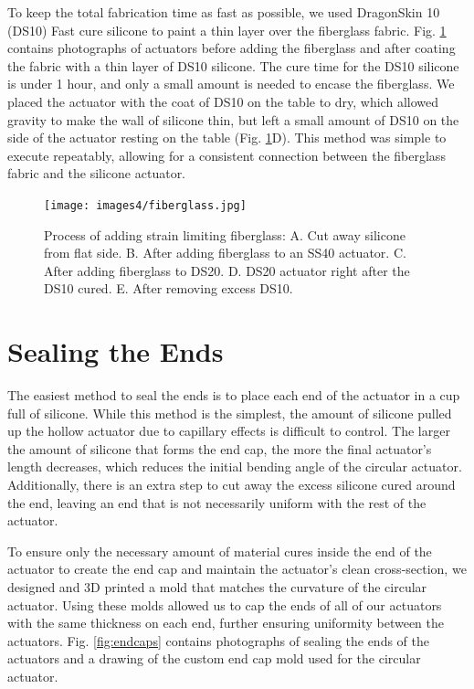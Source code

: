 To keep the total fabrication time as fast as possible, we used DragonSkin 10 (DS10) Fast cure silicone to paint a thin layer over the fiberglass fabric. Fig. \ref{fig:fiberglass} contains photographs of actuators before adding the fiberglass and after coating the fabric with a thin layer of DS10 silicone. The cure time for the DS10 silicone is under 1 hour, and only a small amount is needed to encase the fiberglass. We placed the actuator with the coat of DS10 on the table to dry, which allowed gravity to make the wall of silicone thin, but left a small amount of DS10 on the side of the actuator resting on the table (Fig. \ref{fig:fiberglass}D). This method was simple to execute repeatably, allowing for a consistent connection between the fiberglass fabric and the silicone actuator. 

\begin{figure}[ht!]
    \centering
    \texttt{[image: images4/fiberglass.jpg]}
    \caption{Process of adding strain limiting fiberglass: A. Cut away silicone from flat side. B. After adding fiberglass to an SS40 actuator. C. After adding fiberglass to DS20. D. DS20 actuator right after the DS10 cured. E. After removing excess DS10.}
    \label{fig:fiberglass}
\end{figure}

\clearpage
\section{Sealing the Ends}

The easiest method to seal the ends is to place each end of the actuator in a cup full of silicone. While this method is the simplest, the amount of silicone pulled up the hollow actuator due to capillary effects is difficult to control. The larger the amount of silicone that forms the end cap, the more the final actuator's length decreases, which reduces the initial bending angle of the circular actuator. Additionally, there is an extra step to cut away the excess silicone cured around the end, leaving an end that is not necessarily uniform with the rest of the actuator. 

To ensure only the necessary amount of material cures inside the end of the actuator to create the end cap and maintain the actuator's clean cross-section, we designed and 3D printed a mold that matches the curvature of the circular actuator. Using these molds allowed us to cap the ends of all of our actuators with the same thickness on each end, further ensuring uniformity between the actuators. Fig. \ref{fig:endcaps} contains photographs of sealing the ends of the actuators and a drawing of the custom end cap mold used for the circular actuator. 

